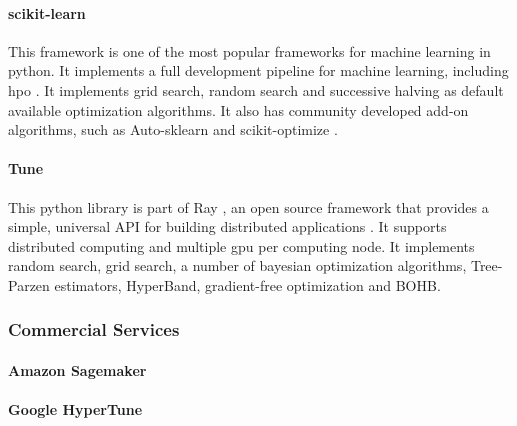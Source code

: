 \paragraph{scikit-learn} This framework is one of the most popular frameworks for machine learning in \acrshort{python}. It implements a full development pipeline for machine learning, including \acrshort{hpo} \parencite{scikit-learn}. It implements grid search, random search and successive halving as default available optimization algorithms. It also has community developed add-on algorithms, such as Auto-sklearn \parencite{auto-sklearn} and scikit-optimize \parencite{scikit-optimize}.

\paragraph{Tune} This \acrshort{python} library is part of Ray \parencite{ray}, an open source framework that provides a simple, universal API for building distributed applications \parencite{liaw2018tune}. It supports distributed computing and multiple \acrshort{gpu} per computing node. It implements random search, grid search, a number of bayesian optimization algorithms, Tree-Parzen estimators, HyperBand, gradient-free optimization and BOHB.

\subsubsection{Commercial Services}

\paragraph{Amazon Sagemaker}

\paragraph{Google HyperTune}
